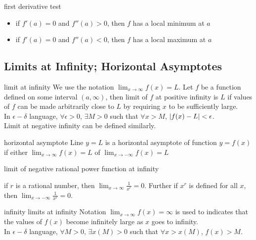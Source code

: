 \documentclass[Calculus 1 Recitation.tex]{subfiles}
\begin{document}
\begin{myleftlinebox}
	first derivative test
	\tcblower
	\begin{itemize}
		\item if $f'(a)=0$ and $f''(a) > 0$, then $f$ has a local minimum at $a$
		\item if $f'(a)=0$ and $f''(a) < 0$, then $f$ has a local maximum at $a$
	\end{itemize}
\end{myleftlinebox}

\subsection{Limits at Infinity; Horizontal Asymptotes}

\begin{myleftlinebox}
	limit at infinity
	\tcblower
	We use the notation $\lim_{x\to\infty} f(x)=L$. Let $f$ be a function defined on some interval $(a,\infty)$, then limit of $f$ at positive infinity is $L$ if values of $f$ can be made arbitrarily close to $L$ by requiring $x$ to be sufficiently large.\\
	In $\epsilon-\delta$ language, $\forall \epsilon >0$, $\exists M>0$ such that $\forall x>M$, $\left\vert f(x)-L\right\vert<\epsilon$.\\
	Limit at negative infinity can be defined similarly.
\end{myleftlinebox}

\begin{myleftlinebox}
	horizontal asymptote
	\tcblower
	Line $y=L$ is a horizontal asymptote of function $y=f(x)$ if either $\lim_{x\to\infty} f(x)=L$ of $\lim_{x\to-\infty} f(x)=L$
\end{myleftlinebox}

\begin{myleftlinebox}
	limit of negative rational power function at infinity
	\tcblower
	\begin{theorem}
		if $r$ is a rational number, then $\lim_{x\to\infty} \frac{1}{x^r}=0$. Further if $x^{r}$ is defined for all $x$, then $\lim_{x\to-\infty} \frac{1}{x^r}=0$.
	\end{theorem}
\end{myleftlinebox}

\begin{myleftlinebox}
	infinity limits at infinity
	\tcblower
	Notation $\lim_{x\to\infty} f(x)=\infty$ is used to indicates that the values of $f(x)$ become infinitely large as $x$ goes to infinity.\\
	In $\epsilon-\delta$ language, $\forall M >0$, $\exists x(M)>0$ such that $\forall x>x(M)$, $f(x)>M$.
\end{myleftlinebox}
\end{document}
